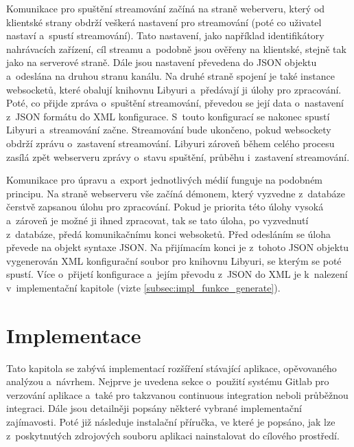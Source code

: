 \documentclass[thesis=M,czech]{FITthesis}[2012/06/26]
\begin{document}
	Komunikace pro spuštění streamování začíná na straně weberveru, který od klientské strany obdrží veškerá nastavení pro streamování (poté co uživatel nastaví a~spustí streamování). Tato nastavení, jako například identifikátory nahrávacích zařízení, cíl streamu a~podobně jsou ověřeny na klientské, stejně tak jako na serverové straně. Dále jsou nastavení převedena do JSON objektu a~odeslána na druhou stranu kanálu. Na druhé straně spojení je také instance websocketů, které obalují knihovnu Libyuri a~předávají ji úlohy pro zpracování. Poté, co přijde zpráva o~spuštění streamování, převedou se její data o~nastavení z~JSON formátu do XML konfigurace. S~touto konfigurací se nakonec spustí Libyuri a~streamování začne. Streamování bude ukončeno, pokud websockety obdrží zprávu o~zastavení streamování. Libyuri zároveň během celého procesu zasílá zpět webserveru zprávy o~stavu spuštění, průběhu i~zastavení streamování.
	
	Komunikace pro úpravu a~export jednotlivých médií funguje na podobném principu. Na straně webserveru vše začíná démonem, který vyzvedne z~databáze čerstvě zapsanou úlohu pro zpracování. Pokud je priorita této úlohy vysoká a~zároveň je možné ji ihned zpracovat, tak se tato úloha, po vyzvednutí z~databáze, předá komunikačnímu konci websoketů. Před odesláním se úloha převede na objekt syntaxe JSON. Na přijímacím konci je z~tohoto JSON objektu vygenerován XML konfigurační soubor pro knihovnu Libyuri, se kterým se poté spustí. Více o~přijetí konfigurace a~jejím převodu z~JSON do XML je k~nalezení v~implementační kapitole (vizte \ref{subsec:impl_funkce_generate}).
	
\chapter{Implementace} \label{chap:impl}
Tato kapitola se zabývá implementací rozšíření stávající aplikace, opěvovaného analýzou a~návrhem. Nejprve je uvedena sekce o~použití systému Gitlab pro verzování aplikace a~také pro takzvanou continuous integration neboli průběžnou integraci. Dále jsou detailněji popsány některé vybrané implementační zajímavosti. Poté již následuje instalační příručka, ve které je popsáno, jak lze z~poskytnutých zdrojových souboru aplikaci nainstalovat do cílového prostředí.
\end{document}
